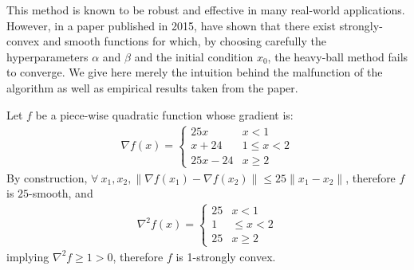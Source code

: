 \documentclass{article}
\begin{document}
This method is known to be robust and effective in many real-world applications. However, in a paper published in 2015, \citet{2014arXiv1408.3595L} have shown that there exist strongly-convex and smooth functions for which, by choosing carefully the hyperparameters $\alpha$ and $\beta$ and the initial condition $x_0$, the heavy-ball method fails to converge. We give here merely the intuition behind the malfunction of the algorithm as well as empirical results taken from the paper.

\vspace{2ex}

Let $f$ be a piece-wise quadratic function whose gradient is:
\begin{gather}
	\nabla f(x) =  \begin{cases}
    25x &   x < 1 \\
    x+24   &  1 \leq x < 2 \\
    25x-24 & x \geq 2
\end{cases}
\end{gather}
By construction,  $\forall \ x_1, x_2, \|\nabla f(x_1)-\nabla f(x_2)\| \leq 25\|x_1 - x_2\|$, therefore $f$ is $25$-smooth, and 
\begin{gather}
\nabla^2 f(x) =
\begin{cases}
    25 &  x < 1 \\
    1   &  \leq x < 2 \\
    25 & x\geq 2
\end{cases}
\end{gather}
implying $\nabla^2 f \geq 1>0$, therefore $f$ is 1-strongly convex.\\
\end{document}
